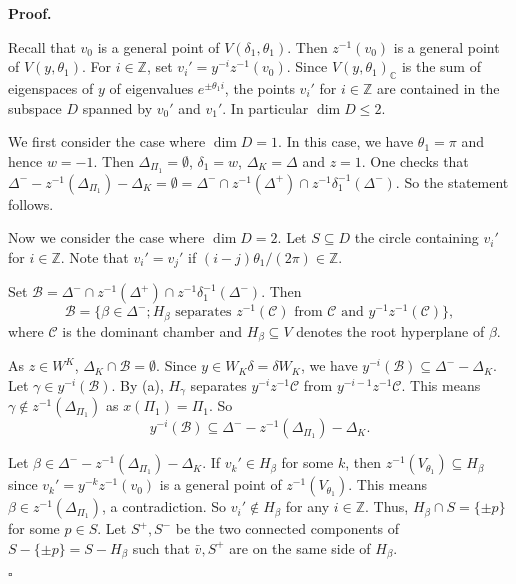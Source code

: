 \documentclass[12pt,leqno]{article}
\newcommand{\qed}{\hfill $\square$ \medskip}
\newenvironment{proof}[1][Proof]{\noindent\textbf{#1.} }{\qed}
\newcommand{\caC}{\mathcal C}
\newcommand{\g}{\mathfrak g}
\def\le{\leqslant}
\def\b{\beta}
\def\g{\gamma}
\def\d{\delta}
\def\D{\Delta}
\def\th{\theta}
\def\i{^{-1}}
\begin{document}
\begin{proof}
	
	Recall that $v_0$ is a general point of $V(\d_1, \th_1)$. Then $z \i(v_0)$ is a general point of $V(y, \th_1)$. For $i \in \mathbb Z$, set $v_i'=y^{-i} z^{-1} (v_0)$. Since $V(y, \th_1)_{\mathbb C}$ is the sum of eigenspaces of $y$ of eigenvalues $e^{\pm \th_1 i}$,  the points $v_i'$ for $i \in \mathbb Z$ are contained in the subspace $D$ spanned by $v_0'$ and $v_1'$. In particular $\dim D \le 2$.
	
	We first consider the case where $\dim D=1$. In this case, we have $\th_1 = \pi$ and hence $w=-1$. Then $\D_{\Pi_1} = \emptyset$, $\d_1 = w$, $\D_K = \D$ and $z=1$. One checks that $\D^- - z \i(\D_{\Pi_1})-\D_K = \emptyset = \D^- \cap z \i(\D^+) \cap z \i \d_1 \i(\D^-)$. So the statement follows.
	
	Now we consider the case where $\dim D=2$. Let $S \subseteq D$ the circle containing $v_i'$ for $i \in \mathbb Z$. Note that $v_i'=v_j'$ if $(i-j)\th_1/(2\pi) \in \mathbb Z$.
	
	
	Set $\mathcal B= \D^- \cap z \i(\D^+) \cap z \i \d_1 \i(\D^-)$. Then \[\tag{a}\mathcal B=\{\b \in \D^-; H_\b \text{ separates } z^{-1}(\caC) \text{ from } \caC \text{ and } y^{-1} z^{-1}(\caC)\},\] where $\caC$ is the dominant chamber and $H_\b \subseteq V$ denotes the root hyperplane of $\b$.
	
	As $z \in W^K$, $\D_K \cap \mathcal B = \emptyset$. Since $y \in W_K \d =\d W_K$, we have $y^{-i}(\mathcal B) \subseteq \D^- - \D_K$. Let $\g \in y^{-i}(\mathcal B)$. By (a), $H_\g$ separates $y^{-i} z^{-1} \caC$ from $y^{-i-1} z^{-1} \caC$. This means $\g \notin z^{-1}(\D_{\Pi_1})$ as $x(\Pi_1)=\Pi_1$. So $$y^{-i}(\mathcal B) \subseteq \D^- - z^{-1}(\D_{\Pi_1}) -\D_K.$$
	
	Let $\b \in \D^- - z^{-1}(\D_{\Pi_1}) -\D_K$. If $v_k' \in H_\b$ for some $k$, then $z^{-1}(V_{\th_1}) \subseteq H_\b$ since $v_k'=y^{-k} z^{-1}(v_0)$ is a general point of $z^{-1}(V_{\th_1})$. This means $\b \in z^{-1}(\D_{\Pi_1})$, a contradiction. So $v_i' \notin H_\b$ for any $i \in \mathbb Z$. Thus, $H_\b \cap S = \{\pm p\}$ for some $p \in S$. Let $S^+, S^-$ be the two connected components of $S - \{\pm p\}=S - H_\b$ such that $\bar v, S^+$ are on the same side of $H_\b$. 
	

\end{proof}
\end{document}
